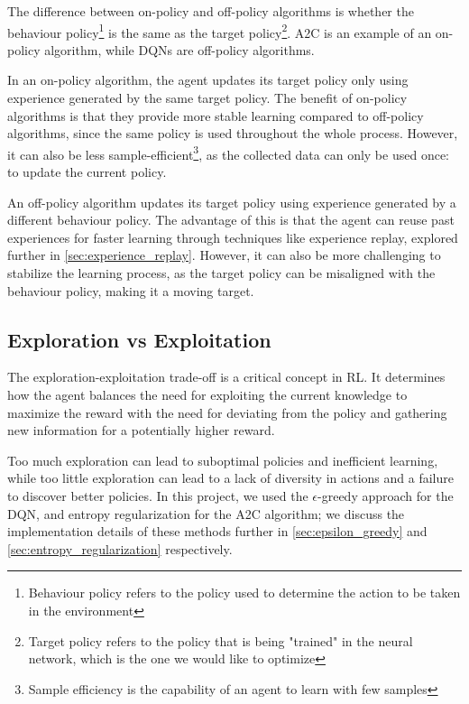 The difference between on-policy and off-policy algorithms is whether the
behaviour policy\footnote{Behaviour policy refers to the policy used to
  determine the action to be taken in the environment} is the same as the target
policy\footnote{Target policy refers to the policy that is being "trained" in
  the neural network, which is the one we would like to optimize}. A2C is an
example of an on-policy algorithm, while DQNs are off-policy algorithms.

In an on-policy algorithm, the agent updates its target policy only using
experience generated by the same target policy. The benefit of on-policy
algorithms is that they provide more stable learning compared to off-policy
algorithms, since the same policy is used throughout the whole process.
However, it can also be less sample-efficient\footnote{Sample efficiency is the
  capability of an agent to learn with few samples}, as the collected data can
only be used once: to update the current policy.

An off-policy algorithm updates its target policy using experience generated by
a different behaviour policy. The advantage of this is that the agent can reuse
past experiences for faster learning through techniques like experience replay,
explored further in \autoref{sec:experience_replay}. However, it can also be
more challenging to stabilize the learning process, as the target policy can be
misaligned with the behaviour policy, making it a moving target.

\subsection{Exploration vs Exploitation}

The exploration-exploitation trade-off is a critical concept in RL. It
determines how the agent balances the need for exploiting the current knowledge
to maximize the reward with the need for deviating from the policy and
gathering new information for a potentially higher reward.

Too much exploration can lead to suboptimal policies and inefficient learning,
while too little exploration can lead to a lack of diversity in actions and a
failure to discover better policies. In this project, we used the
$\epsilon$-greedy approach for the DQN, and entropy regularization for the A2C
algorithm; we discuss the implementation details of these methods further in
\autoref{sec:epsilon_greedy} and \autoref{sec:entropy_regularization}
respectively.

